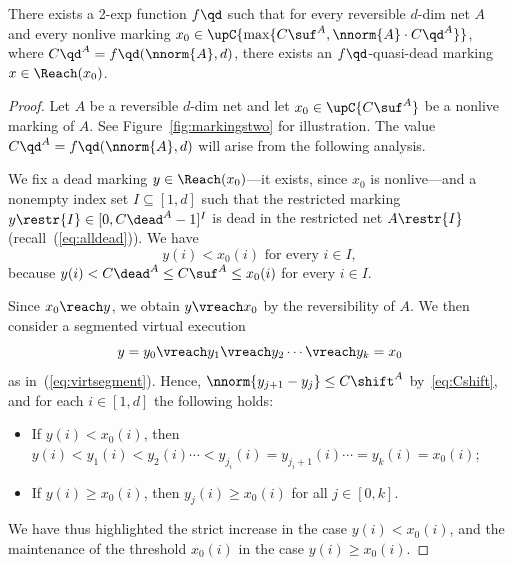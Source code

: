 \begin{lem}\label{lem:reachquasi}
	There exists a 2-exp function
$f\qd$ such that 
for every reversible $d$-dim net $A$ and 
	every nonlive marking
$x_0\in\upC{\max\{C\suf^A,\nnorm{A}\cdot C\qd^A\}}$, where
$C\qd^A=f\qd(\nnorm{A},d)$,
	there exists an $f\qd$-quasi-dead marking $x\in\Reach(x_0)$.
\end{lem}
\begin{proof}
Let $A$ be a reversible $d$-dim net and 
let	$x_0\in\upC{C\suf^A}$ be
	a nonlive marking of $A$.
	See Figure~\ref{fig:markingstwo} for illustration.
	The value $C\qd^A=f\qd(\nnorm{A},d)$ will arise from the
	following analysis.

	We fix a dead marking
	$y\in\Reach(x_0)$---it exists, since $x_0$ is nonlive---and a nonempty index set $I\subseteq [1,d]$ such that the
	restricted marking 
	$y\restr{I}\in[0,C\dead^A-1]^I$ is dead in the restricted net
	$A\restr{I}$ (recall~(\ref{eq:alldead})).
We have 
	\begin{equation}\label{eq:Iless}
		y(i)< x_0(i)\text{ for every }i\in I,
	\end{equation}		
because $y(i)< C\dead^A\leq C\suf^A\leq x_0(i)$ for every $i\in I$.

	Since  $x_0\reach y$, we obtain $y\vreach x_0$ by
the reversibility of $A$. We then consider a segmented
 virtual execution  
	\begin{equation}\label{eq:downup}
y=y_0\vreach y_1\vreach y_2\cdots\vreach y_k=x_0
	\end{equation}
	as in~(\ref{eq:virtsegment}).
	Hence, $\nnorm{y_{j+1}-y_j}\leq C\shift^A$ by~\eqref{eq:Cshift}, and 
for each $i\in[1,d]$ the following holds:
\begin{itemize}
\item If $y(i)<x_0(i)$, then
	$y(i)<y_1(i)<y_2(i)\cdots <y_{j_i}(i)=y_{j_i+1}(i)\cdots
	=y_k(i)=x_0(i)$;
\item	
If $y(i)\geq x_0(i)$, then $y_j(i)\geq x_0(i)$ for all
	$j\in[0,k]$.
	\end{itemize}
We have thus highlighted the strict increase in the case
	$y(i)<x_0(i)$, and the maintenance of the threshold $x_0(i)$ in
	the case $y(i)\geq x_0(i)$.


\end{proof}
